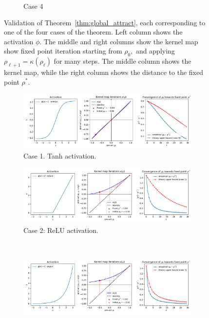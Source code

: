 \documentclass[twoside]{article}
\theoremstyle{definition}
\begin{document}
\begin{figure}[ht]
\begin{subfigure}[b]{0.7\textwidth}
        \caption{\small Case 4}
    \end{subfigure}
    \caption{\small Validation of Theorem~\ref{thm:global_attract}, each corresponding to one of the four cases of the theorem. Left column shows the activation $\phi.$ The middle and right columns show the kernel map show fixed point iteration starting from $\rho_0,$ and applying $\rho_{\ell+1}=\kappa(\rho_\ell)$ for many steps. The middle column shows the kernel map, while the right column shows the distance to the fixed point $\rho^*$.}
    \label{fig:validation_plots}
\end{figure}

\begin{figure}[ht!]
    \centering
    \begin{subfigure}[b]{0.7\textwidth}
        \centering
        \includegraphics[width=\textwidth]{./kernel_map_convergence_case_0_tanh.pdf}
        \caption{\small Case 1. Tanh activation.}
    \end{subfigure}
    \hfill
    \begin{subfigure}[b]{0.7\textwidth}
        \centering
        \includegraphics[width=\textwidth]{./kernel_map_convergence_case_1_relu.pdf}
        \caption{\small Case 2: ReLU activation.}
    \end{subfigure}
    \\
    \begin{subfigure}[b]{0.7\textwidth}
        \centering
        \includegraphics[width=\textwidth]{./kernel_map_convergence_case_2_exp.pdf}

\end{subfigure}
\end{figure}
\end{document}
